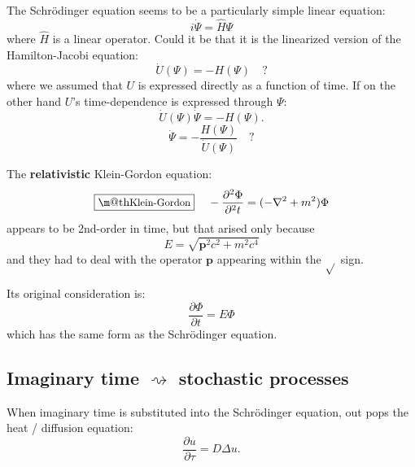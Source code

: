 \documentclass[orivec]{llncs}
\makeatletter
\newcommand{\vect}[1]{\boldsymbol{#1}}
\renewcommand{\boxed}[1]{\fbox{\m@th$\displaystyle\scalebox{0.9}{#1}$} \,}
\makeatother
\begin{document}
The Schr\"odinger equation seems to be a particularly simple linear equation:
\begin{equation}
i \dot{\Psi} = \hat{H} \Psi
\end{equation}
where $\hat{H}$ is a linear operator.  Could it be that it is the linearized version of the Hamilton-Jacobi equation:
\begin{equation}
\dot{U}(\Psi) = - H(\Psi) \quad ?
\end{equation}
where we assumed that $U$ is expressed directly as a function of time.  If on the other hand $U$'s time-dependence is expressed through $\Psi$:
\begin{equation}
\dot{U} (\Psi) \dot{\Psi} = - H(\Psi) .
\end{equation}
\begin{equation}
\dot{\Psi} = - \frac{H(\Psi)}{\dot{U}(\Psi)} \quad ?
\end{equation}

\begin{tcolorbox}[colback=grey, breakable, enhanced] %

The \textbf{relativistic} Klein-Gordon equation:
\begin{equation}
\boxed{\mbox{Klein-Gordon}} \quad
- \frac{\partial^2 \Phi}{\partial^2 t} = (- \nabla^2 + m^2) \Phi
\end{equation}
appears to be 2nd-order in time, but that arised only because
\begin{equation}
E = \sqrt{\vect{p}^2 c^2 + m^2 c^4}
\end{equation}
and they had to deal with the operator $\vect{p}$ appearing within the $\sqrt{}$ sign.

Its original consideration is:
\begin{equation}
\frac{\partial \Phi}{\partial t} = E \Phi
\end{equation}
which has the same form as the Schr\"odinger equation.

\end{tcolorbox} %

\subsection{Imaginary time $\rightsquigarrow$ stochastic processes}

When imaginary time is substituted into the Schr\"odinger equation, out pops the heat / diffusion equation:
\begin{equation}
\frac{\partial u}{\partial \tau} = D \Delta u .
\end{equation}
\end{document}
